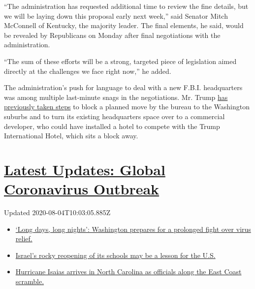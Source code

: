 ``The administration has requested additional time to review the fine
details, but we will be laying down this proposal early next week,''
said Senator Mitch McConnell of Kentucky, the majority leader. The final
elements, he said, would be revealed by Republicans on Monday after
final negotiations with the administration.

``The sum of these efforts will be a strong, targeted piece of
legislation aimed directly at the challenges we face right now,'' he
added.

The administration's push for language to deal with a new F.B.I.
headquarters was among multiple last-minute snags in the negotiations.
Mr. Trump
\href{https://www.nytimes3xbfgragh.onion/2018/10/18/us/politics/fbi-headquarters-building-trump.html}{has
previously taken steps} to block a planned move by the bureau to the
Washington suburbs and to turn its existing headquarters space over to a
commercial developer, who could have installed a hotel to compete with
the Trump International Hotel, which sits a block away.

\hypertarget{latest-updates-global-coronavirus-outbreak}{%
\section{\texorpdfstring{\href{https://www.nytimes3xbfgragh.onion/2020/08/04/world/coronavirus-covid-19.html?action=click\&pgtype=Article\&state=default\&region=MAIN_CONTENT_1\&context=storylines_live_updates}{Latest
Updates: Global Coronavirus
Outbreak}}{Latest Updates: Global Coronavirus Outbreak}}\label{latest-updates-global-coronavirus-outbreak}}

Updated 2020-08-04T10:03:05.885Z

\begin{itemize}
\tightlist
\item
  \href{https://www.nytimes3xbfgragh.onion/2020/08/04/world/coronavirus-covid-19.html?action=click\&pgtype=Article\&state=default\&region=MAIN_CONTENT_1\&context=storylines_live_updates\#link-6b644638}{`Long
  days, long nights': Washington prepares for a prolonged fight over
  virus relief.}
\item
  \href{https://www.nytimes3xbfgragh.onion/2020/08/04/world/coronavirus-covid-19.html?action=click\&pgtype=Article\&state=default\&region=MAIN_CONTENT_1\&context=storylines_live_updates\#link-7af9fca0}{Israel's
  rocky reopening of its schools may be a lesson for the U.S.}
\item
  \href{https://www.nytimes3xbfgragh.onion/2020/08/04/world/coronavirus-covid-19.html?action=click\&pgtype=Article\&state=default\&region=MAIN_CONTENT_1\&context=storylines_live_updates\#link-33bf9168}{Hurricane
  Isaias arrives in North Carolina as officials along the East Coast
  scramble.}
\end{itemize}


